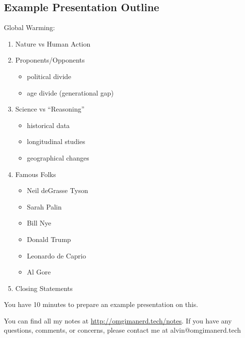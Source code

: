 \documentclass{article}
\begin{document}
\subsection*{Example Presentation Outline}
Global Warming:
\begin{enumerate}
  \item Nature vs Human Action
  \item Proponents/Opponents
    \begin{itemize}
      \item political divide
      \item age divide (generational gap)
    \end{itemize}
  \item Science vs ``Reasoning''
    \begin{itemize}
      \item historical data
      \item longitudinal studies
      \item geographical changes
    \end{itemize}
  \item Famous Folks
    \begin{itemize}
      \item Neil deGrasse Tyson
      \item Sarah Palin
      \item Bill Nye
      \item Donald Trump
      \item Leonardo de Caprio
      \item Al Gore
    \end{itemize}
  \item Closing Statements
\end{enumerate}
You have 10 minutes to prepare an example presentation on this.

\begin{center}
  You can find all my notes at \url{http://omgimanerd.tech/notes}. If you have
  any questions, comments, or concerns, please contact me at
  alvin@omgimanerd.tech
\end{center}
\end{document}
